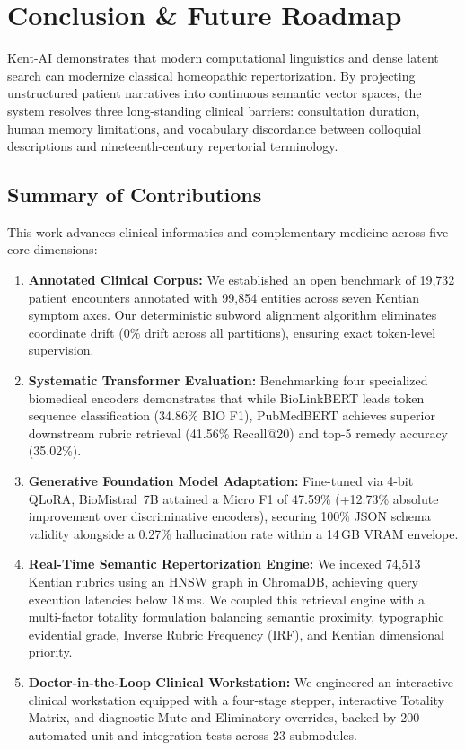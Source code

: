 \section{Conclusion \& Future Roadmap}
\label{sec:conclusion}

Kent-AI demonstrates that modern computational linguistics and dense latent search can modernize classical homeopathic repertorization. By projecting unstructured patient narratives into continuous semantic vector spaces, the system resolves three long-standing clinical barriers: consultation duration, human memory limitations, and vocabulary discordance between colloquial descriptions and nineteenth-century repertorial terminology.

\subsection{Summary of Contributions}

This work advances clinical informatics and complementary medicine across five core dimensions:
\begin{enumerate}
    \item \textbf{Annotated Clinical Corpus:} We established an open benchmark of 19,732 patient encounters annotated with 99,854 entities across seven Kentian symptom axes. Our deterministic subword alignment algorithm eliminates coordinate drift ($0$\% drift across all partitions), ensuring exact token-level supervision.
    \item \textbf{Systematic Transformer Evaluation:} Benchmarking four specialized biomedical encoders demonstrates that while BioLinkBERT leads token sequence classification (34.86\% BIO F1), PubMedBERT achieves superior downstream rubric retrieval (41.56\% Recall@20) and top-5 remedy accuracy (35.02\%).
    \item \textbf{Generative Foundation Model Adaptation:} Fine-tuned via 4-bit QLoRA, BioMistral~7B attained a Micro F1 of 47.59\% (+12.73\% absolute improvement over discriminative encoders), securing 100\% JSON schema validity alongside a 0.27\% hallucination rate within a 14\,GB VRAM envelope.
    \item \textbf{Real-Time Semantic Repertorization Engine:} We indexed 74,513 Kentian rubrics using an HNSW graph in ChromaDB, achieving query execution latencies below 18\,ms. We coupled this retrieval engine with a multi-factor totality formulation balancing semantic proximity, typographic evidential grade, Inverse Rubric Frequency (IRF), and Kentian dimensional priority.
    \item \textbf{Doctor-in-the-Loop Clinical Workstation:} We engineered an interactive clinical workstation equipped with a four-stage stepper, interactive Totality Matrix, and diagnostic Mute and Eliminatory overrides, backed by 200 automated unit and integration tests across 23 submodules.
\end{enumerate}

